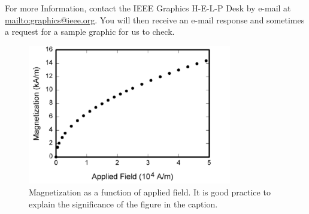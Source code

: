 For more Information, contact the IEEE Graphics H-E-L-P Desk by e-mail at 
\href {mailto:graphics@ieee.org}{mailto:graphics@ieee.org}. You will then receive an e-mail response and 
sometimes a request for a sample graphic for us to check.

\begin{figure}
\centerline{\includegraphics[width=3.5in]{fig1}}
\caption{Magnetization as a function of applied field.
It is good practice to explain the significance of the figure in the
caption.\label{fig1}}
\end{figure}

